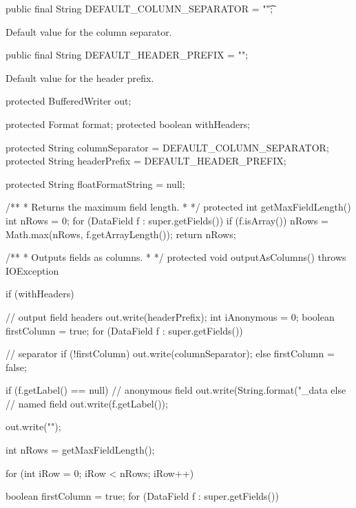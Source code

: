 \begin{code}
   public final String DEFAULT_COLUMN_SEPARATOR = "\t";
\end{code}
\begin{tabb}
Default value for the column separator.
\end{tabb}
\begin{code}

   public final String DEFAULT_HEADER_PREFIX = "";
\end{code}
\begin{tabb}
Default value for the header prefix.
\end{tabb}
\begin{code}\begin{hide}

   protected BufferedWriter out;

   protected Format format;
   protected boolean withHeaders;

   protected String columnSeparator = DEFAULT_COLUMN_SEPARATOR;
   protected String headerPrefix = DEFAULT_HEADER_PREFIX;
   
   protected String floatFormatString = null;


   /**
    * Returns the maximum field length.
    *
    */
   protected int getMaxFieldLength() {
      int nRows = 0;      
      for (DataField f : super.getFields()) {
         if (f.isArray())
            nRows = Math.max(nRows, f.getArrayLength());
      }
      return nRows;
   }

   /**
    * Outputs fields as columns.
    *
    */
   protected void outputAsColumns() throws IOException {
      
      if (withHeaders) {
         // output field headers
         out.write(headerPrefix);
         int iAnonymous = 0;
         boolean firstColumn = true;
         for (DataField f : super.getFields()) {
            // separator
            if (!firstColumn)
               out.write(columnSeparator);
            else
               firstColumn = false;

            if (f.getLabel() == null)
               // anonymous field
               out.write(String.format("_data%
            else
               // named field
               out.write(f.getLabel());
         }
         out.write("\n");
      }

      int nRows = getMaxFieldLength();

      for (int iRow = 0; iRow < nRows; iRow++) {
         boolean firstColumn = true;
         for (DataField f : super.getFields()) {

}}}
\end{hide}
\end{code}

